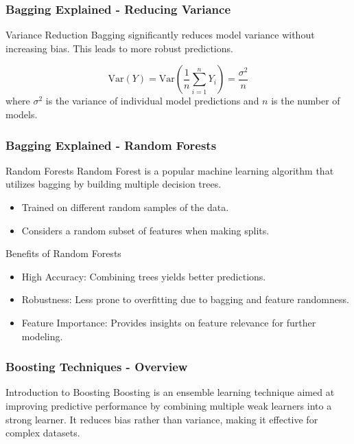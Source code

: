 \documentclass[aspectratio=169]{beamer}
\begin{document}
\begin{frame}[fragile]
  \frametitle{Bagging Explained - Reducing Variance}
  \begin{block}{Variance Reduction}
    Bagging significantly reduces model variance without increasing bias. This leads to more robust predictions.
  \end{block}
  \begin{equation}
    \text{Var}(Y) = \text{Var}\left(\frac{1}{n} \sum_{i=1}^n Y_i \right) = \frac{\sigma^2}{n}
  \end{equation}
  where \( \sigma^2 \) is the variance of individual model predictions and \( n \) is the number of models.
\end{frame}

\begin{frame}[fragile]
  \frametitle{Bagging Explained - Random Forests}
  \begin{block}{Random Forests}
    Random Forest is a popular machine learning algorithm that utilizes bagging by building multiple decision trees.
  \end{block}
  \begin{itemize}
    \item Trained on different random samples of the data.
    \item Considers a random subset of features when making splits.
  \end{itemize}

  \begin{block}{Benefits of Random Forests}
    \begin{itemize}
      \item High Accuracy: Combining trees yields better predictions.
      \item Robustness: Less prone to overfitting due to bagging and feature randomness.
      \item Feature Importance: Provides insights on feature relevance for further modeling.
    \end{itemize}
  \end{block}
\end{frame}

\begin{frame}[fragile]
  \frametitle{Boosting Techniques - Overview}
  \begin{block}{Introduction to Boosting}
    Boosting is an ensemble learning technique aimed at improving predictive performance by combining multiple weak learners into a strong learner. It reduces bias rather than variance, making it effective for complex datasets.
  \end{block}
\end{frame}
\end{document}
